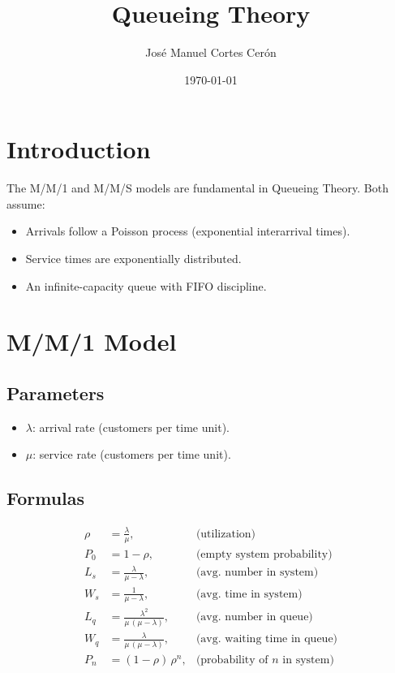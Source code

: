 \documentclass[12pt,a4paper]{article}
\title{Queueing Theory}
\author{José Manuel Cortes Cerón}
\date{\today}
\begin{document}
\maketitle

\section*{Introduction}
The M/M/1 and M/M/S models are fundamental in Queueing Theory. Both assume:
\begin{itemize}
  \item Arrivals follow a Poisson process (exponential interarrival times).
  \item Service times are exponentially distributed.
  \item An infinite-capacity queue with FIFO discipline.
\end{itemize}

\section{M/M/1 Model}
\subsection*{Parameters}
\begin{itemize}
  \item \(\lambda\): arrival rate (customers per time unit).
  \item \(\mu\): service rate (customers per time unit).
\end{itemize}

\subsection*{Formulas}
\begin{align*}
\rho    &= \frac{\lambda}{\mu},                    &\text{(utilization)}\\
P_{0}   &= 1 - \rho,                               &\text{(empty system probability)}\\
L_{s}   &= \frac{\lambda}{\mu - \lambda},          &\text{(avg.\ number in system)}\\
W_{s}   &= \frac{1}{\mu - \lambda},                &\text{(avg.\ time in system)}\\
L_{q}   &= \frac{\lambda^2}{\mu\,(\mu - \lambda)}, &\text{(avg.\ number in queue)}\\
W_{q}   &= \frac{\lambda}{\mu\,(\mu - \lambda)},   &\text{(avg.\ waiting time in queue)}\\
P_{n}   &= (1 - \rho)\,\rho^n,                     &\text{(probability of \(n\) in system)}
\end{align*}
\end{document}
